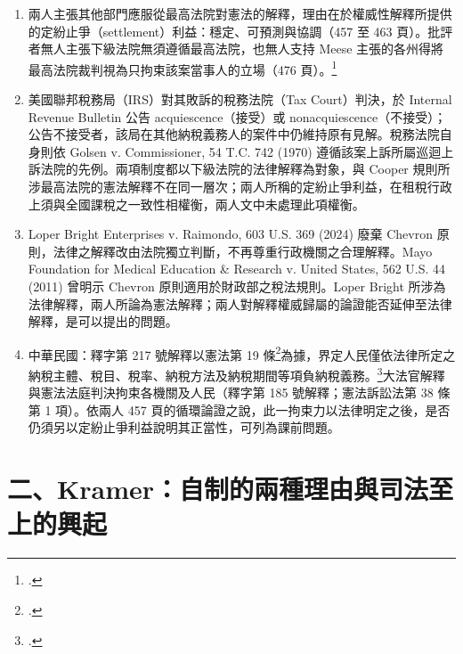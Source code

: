\begin{enumerate}
\tightlist
\item
  兩人主張其他部門應服從最高法院對憲法的解釋，理由在於權威性解釋所提供的定紛止爭（settlement）利益：穩定、可預測與協調（457 至 463 頁）。批評者無人主張下級法院無須遵循最高法院，也無人支持 Meese 主張的各州得將最高法院裁判視為只拘束該案當事人的立場（476 頁）。\footcite[457--463, 476]{alexander2000}
\item
  美國聯邦稅務局（IRS）對其敗訴的稅務法院（Tax Court）判決，於 Internal Revenue Bulletin 公告 acquiescence（接受）或 nonacquiescence（不接受）；公告不接受者，該局在其他納稅義務人的案件中仍維持原有見解。稅務法院自身則依 Golsen v. Commissioner, 54 T.C. 742 (1970) 遵循該案上訴所屬巡迴上訴法院的先例。兩項制度都以下級法院的法律解釋為對象，與 Cooper 規則所涉最高法院的憲法解釋不在同一層次；兩人所稱的定紛止爭利益，在租稅行政上須與全國課稅之一致性相權衡，兩人文中未處理此項權衡。
\item
  Loper Bright Enterprises v. Raimondo, 603 U.S. 369 (2024) 廢棄 Chevron 原則，法律之解釋改由法院獨立判斷，不再尊重行政機關之合理解釋。Mayo Foundation for Medical Education \& Research v. United States, 562 U.S. 44 (2011) 曾明示 Chevron 原則適用於財政部之稅法規則。Loper Bright 所涉為法律解釋，兩人所論為憲法解釋；兩人對解釋權威歸屬的論證能否延伸至法律解釋，是可以提出的問題。
\item
  中華民國：釋字第 217 號解釋以憲法第 19 條\footcite[第 19 條]{roc-constitution}為據，界定人民僅依法律所定之納稅主體、稅目、稅率、納稅方法及納稅期間等項負納稅義務。\footcite{jy217}大法官解釋與憲法法庭判決拘束各機關及人民（釋字第 185 號解釋；憲法訴訟法第 38 條第 1 項）。依兩人 457 頁的循環論證之說，此一拘束力以法律明定之後，是否仍須另以定紛止爭利益說明其正當性，可列為課前問題。
\end{enumerate}

\section{二、Kramer：自制的兩種理由與司法至上的興起}
\label{sec:55_fiscal-2}

